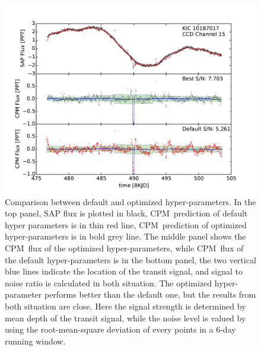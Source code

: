 \documentclass[12pt, preprint]{aastex}
\newcommand{\name}{CPM}
\begin{document}
\begin{figure}[htb]
\centering
\includegraphics[width=\columnwidth]{compare_10187017_bw}
\caption{
  \label{hyperparameter} 
  Comparison between default and optimized hyper-parameters. 
  In the top panel, SAP flux is plotted in black, 
    \name\ prediction of default hyper parameters is in thin red line, 
    \name\ prediction of optimized hyper-parameters is in bold grey line. 
  The middle panel shows the \name\ flux of the optimized hyper-parameters, 
    while \name\ flux of the default hyper-parameters is in the bottom panel, 
    the two vertical blue lines indicate the location of the transit signal, 
    and signal to noise ratio is calculated in both situation. 
  The optimized hyper-parameter performs better than the default one, 
    but the results from both situation are close.
  Here the signal strength is determined by mean depth of the transit signal,
    while the noise level is valued by 
    using the root-mean-square deviation of every points in a 6-day running window.}
\end{figure}

\clearpage
\end{document}
